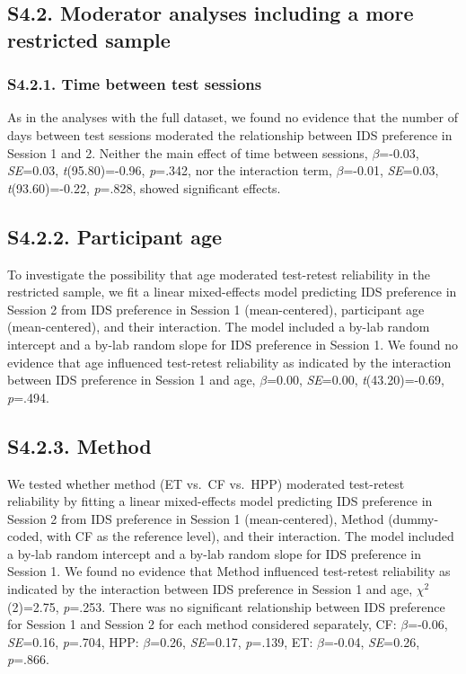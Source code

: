 \documentclass[
  man, donotrepeattitle,floatsintext]{apa6}
\begin{document}
\hypertarget{s4.2.-moderator-analyses-including-a-more-restricted-sample}{%
\subsection{S4.2. Moderator analyses including a more restricted sample}\label{s4.2.-moderator-analyses-including-a-more-restricted-sample}}

\hypertarget{s4.2.1.-time-between-test-sessions}{%
\subsubsection{S4.2.1. Time between test sessions}\label{s4.2.1.-time-between-test-sessions}}

As in the analyses with the full dataset, we found no evidence that the number of days between test sessions moderated the relationship between IDS preference in Session 1 and 2. Neither the main effect of time between sessions, \(\beta\)=-0.03, \emph{SE}=0.03, \emph{t}(95.80)=-0.96, \emph{p}=.342, nor the interaction term, \(\beta\)=-0.01, \emph{SE}=0.03, \emph{t}(93.60)=-0.22, \emph{p}=.828, showed significant effects.

\hypertarget{s4.2.2.-participant-age}{%
\subsection{S4.2.2. Participant age}\label{s4.2.2.-participant-age}}

To investigate the possibility that age moderated test-retest reliability in the restricted sample, we fit a linear mixed-effects model predicting IDS preference in Session 2 from IDS preference in Session 1 (mean-centered), participant age (mean-centered), and their interaction.
The model included a by-lab random intercept and a by-lab random slope for IDS preference in Session 1.
We found no evidence that age influenced test-retest reliability as indicated by the interaction between IDS preference in Session 1 and age, \(\beta\)=0.00, \emph{SE}=0.00, \emph{t}(43.20)=-0.69, \emph{p}=.494.

\hypertarget{s4.2.3.-method}{%
\subsection{S4.2.3. Method}\label{s4.2.3.-method}}

We tested whether method (ET vs.~CF vs.~HPP) moderated test-retest reliability by fitting a linear mixed-effects model predicting IDS preference in Session 2 from IDS preference in Session 1 (mean-centered), Method (dummy-coded, with CF as the reference level), and their interaction.
The model included a by-lab random intercept and a by-lab random slope for IDS preference in Session 1.
We found no evidence that Method influenced test-retest reliability as indicated by the interaction between IDS preference in Session 1 and age, \({\chi}^2\)(2)=2.75, \emph{p}=.253. There was no significant relationship between IDS preference for Session 1 and Session 2 for each method considered separately, CF: \(\beta\)=-0.06, \emph{SE}=0.16, \emph{p}=.704, HPP: \(\beta\)=0.26, \emph{SE}=0.17, \emph{p}=.139, ET: \(\beta\)=-0.04, \emph{SE}=0.26, \emph{p}=.866.
\end{document}
